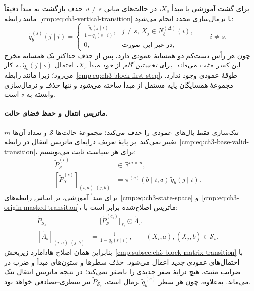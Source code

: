 برای گشت آموزشی با مبدأ $X_s$،
در حالت‌های میانی $i\ne s$، حذف
بازگشت به مبدأ دقیقاً مانند
رابطه~\eqref{cmp:eq:ch3-vertical-transition}
با نرمال‌سازی مجدد انجام می‌شود:
\begin{equation}\label{cmp:eq:ch3-sparse-vertical-transition}
\boxed{
\widetilde q_b^{(s)}(j\mid i)=
\begin{cases}
\displaystyle
\frac{\widetilde q_b(j\mid i)}
{1-\widetilde q_b(s\mid i)},
&j\ne s,\ X_j\in N_b^{(\Delta)}(i),\\[6pt]
0,&\text{در غیر این صورت},
\end{cases}
\qquad i\ne s.
}
\end{equation}
چون هر رأس دست‌کم دو همسایهٔ عمودی
دارد، پس از حذف حداکثر یک همسایه
مخرج این کسر مثبت می‌ماند. برای
\emph{نخستین گام} از خود مبدأ $X_s$،
احتمال $\widetilde q_b(j\mid s)$
به کار می‌رود؛ زیرا مانند
رابطه~\eqref{cmp:eq:ch3-block-first-step}،
طوقهٔ عمودی وجود ندارد. مجموعهٔ
همسایگان پایه مستقل از مبدأ ساخته
می‌شود و تنها حذف و نرمال‌سازی
وابسته به $s$ است.

\paragraph{ماتریس انتقال و حفظ فضای حالت.}
تنک‌سازی فقط یال‌های عمودی را حذف
می‌کند؛ مجموعهٔ حالت‌ها $\mathcal S$
و تعداد آن‌ها $m$ تغییر نمی‌کند.
بر پایهٔ تعریف درایه‌ای ماتریس انتقال
در رابطه~\eqref{cmp:eq:ch3-base-valid-transition}،
برای هر سیاست ثابت می‌نویسیم:
\begin{equation}\label{cmp:eq:ch3-sparse-base-transition}
\boxed{
\begin{aligned}
\widetilde P_{\mathcal S}^{(c)}
&\in\mathbb R^{m\times m},\\
[\widetilde P_{\mathcal S}^{(c)}]_{(i,a),(j,b)}
&=\pi^{(c)}(b\mid i,a)\,
\widetilde q_b(j\mid i).
\end{aligned}
}
\end{equation}
برای مبدأ آموزشی، بر اساس
رابطه‌های~\eqref{cmp:eq:ch3-state-space}
و~\eqref{cmp:eq:ch3-origin-masked-transition}،
ماتریس اصلاح‌شده برابر است با:
\begin{equation}\label{cmp:eq:ch3-sparse-origin-transition}
\boxed{
\begin{aligned}
\widetilde P_{\mathcal S_s}
&=\bigl[\widetilde P_{\mathcal S}^{(c_s)}\bigr]_{\mathcal S_s}
\odot\widetilde\Lambda_s,\\
[\widetilde\Lambda_s]_{(i,a),(j,b)}
&=\frac{1}{1-\widetilde q_b(s\mid i)},
\qquad (X_i,a),(X_j,b)\in\mathcal S_s.
\end{aligned}
}
\end{equation}
بنابراین همان اصلاح هادامارد
زیربخش~\ref{cmp:subsec:ch3-block-matrix-transition}
با احتمال‌های عمودی جدید
اعمال می‌شود. حذف سطرها و ستون‌های
مبدأ و ضرب در ضرایب مثبت، هیچ
درایهٔ صفر جدیدی را ناصفر نمی‌کند؛
در نتیجه ماتریس انتقال تنک می‌ماند.
به‌علاوه، چون هر سطر
$\widetilde q_b^{(s)}$ نرمال است،
$\widetilde P_{\mathcal S_s}$ نیز
سطری--تصادفی خواهد بود.

